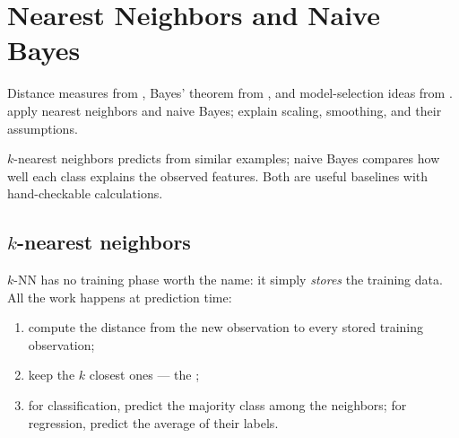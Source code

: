 \chapter{Nearest Neighbors and Naive Bayes}
\label{ch:knn-nb}

\chapterguide%
  {Distance measures from , Bayes' theorem from , and model-selection ideas from .}
  {apply nearest neighbors and naive Bayes; explain scaling, smoothing, and their assumptions.}

$k$-nearest neighbors predicts from similar examples; naive Bayes compares how well each class explains the observed features. Both are useful baselines with hand-checkable calculations.

\section{$k$-nearest neighbors}
\label{sec:knn}

$k$-NN has no training phase worth the name: it simply \emph{stores} the training data. All the work happens at prediction time:

\begin{enumerate}
  \item compute the distance from the new observation to every stored training observation;
  \item keep the $k$ closest ones --- the ;
  \item for classification, predict the majority class among the neighbors; for regression, predict the average of their labels.
\end{enumerate}

\begin{mlfigure}
\end{mlfigure}

